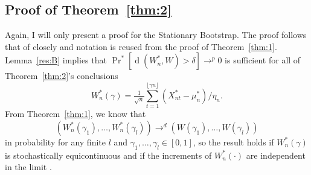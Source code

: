 \documentclass[11pt]{article}
\theoremstyle{definition}
\DeclareMathOperator{\dist}{d}
\DeclareMathOperator{\pr}{Pr}
\begin{document}
\subsection*{Proof of Theorem~\ref{thm:2}}
Again, I will only present a proof for the Stationary Bootstrap.
The proof follows that of \citet{JoD:00b} closely and notation is reused from the
proof of Theorem~\ref{thm:1}.  Lemma~\ref{res:B} implies that
$\pr^{*}[\dist(W_n^{*}, W) > \delta] \to^p 0$ is sufficient for all of Theorem~\ref{thm:2}'s
conclusions
  \begin{equation*}
    W_n^{*}(\gamma) = \tfrac{1}{\sqrt{n}} \sum_{t=1}^{\lfloor \gamma n
      \rfloor} (X^{*}_{nt} - \mu_n^{*})/\eta_{n}.
  \end{equation*}
  From Theorem~\ref{thm:1}, we know that
  \begin{equation*}
    (W^{*}_n(\gamma_1),\dots, W^{*}_n(\gamma_l)) \to^d
    (W(\gamma_1),\dots,W(\gamma_l))
  \end{equation*}
  in probability for any finite $l$ and $\gamma_1,\dots,\gamma_l \in
  [0,1]$, so the result holds if $W_n^{*}(\gamma)$ is stochastically
  equicontinuous and if the increments of $W^{*}_n(\cdot)$ are
  independent in the limit \citep[Theorems~15.4 and~15.5]{Bil:68}.
\end{document}
